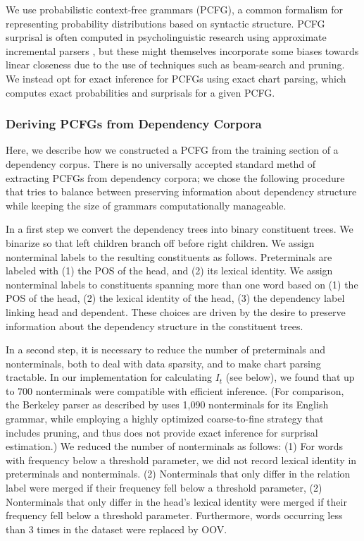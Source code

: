 \documentclass[11pt,letterpaper]{article}
\begin{document}
We use probabilistic context-free grammars (PCFG), a common formalism for representing probability distributions based on syntactic structure.
PCFG surprisal is often computed in psycholinguistic research using approximate incremental parsers \citep{DBLP:journals/coling/Roark01,DBLP:journals/coling/DembergKK13,DBLP:journals/topics/SchijndelES13}, but these might themselves incorporate some biases towards linear closeness due to the use of techniques such as beam-search and pruning.
We instead opt for exact inference for PCFGs using exact chart parsing, which computes exact probabilities and surprisals for a given PCFG.

\subsubsection{Deriving PCFGs from Dependency Corpora}

Here, we describe how we constructed a PCFG from the training section of a dependency corpus.
There is no universally accepted standard methd of extracting PCFGs from dependency corpora; we chose the following procedure that tries to balance between preserving information about dependency structure while keeping the size of grammars computationally manageable.

In a first step we convert the dependency trees into binary constituent trees. We binarize so that left children branch off before right children.
We assign nonterminal labels to the resulting constituents as follows.
Preterminals are labeled with (1) the POS of the head, and (2) its lexical identity.
We assign nonterminal labels to constituents spanning more than one word based on (1) the POS of the head, (2) the lexical identity of the head, (3) the dependency label linking head and dependent.
These choices are driven by the desire to preserve information about the dependency structure in the constituent trees.

In a second step, it is necessary to reduce the number of preterminals and nonterminals, both to deal with data sparsity, and to make chart parsing tractable.
In our implementation for calculating $I_t$ (see below), we found that up to 700 nonterminals were compatible with efficient inference.
(For comparison, the Berkeley parser as described by \citet{DBLP:conf/aaai/PetrovK07} uses 1,090 nonterminals for its English grammar, while employing a highly optimized coarse-to-fine strategy that includes pruning, and thus does not provide exact inference for surprisal estimation.)
We reduced the number of nonterminals as follows:
(1) For words with frequency below a threshold parameter, we did not record lexical identity in preterminals and nonterminals.
(2) Nonterminals that only differ in the relation label were merged if their frequency fell below a threshold parameter,
(2) Nonterminals that only differ in the head's lexical identity were merged if their frequency fell below a threshold parameter.
Furthermore, words occurring less than 3 times in the dataset were replaced by OOV.
\end{document}
